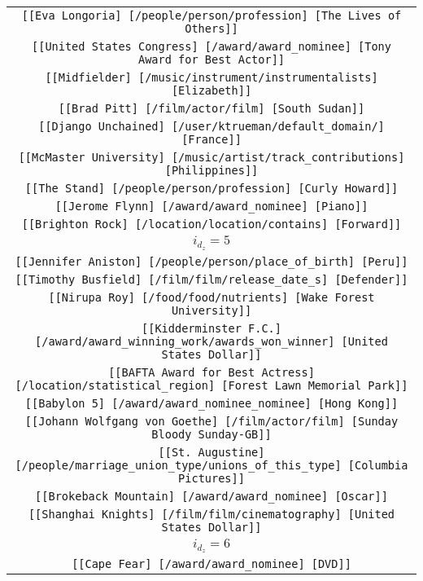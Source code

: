 \begin{longtable}{|c|}
    \texttt{[[Eva Longoria] [/people/person/profession] [The Lives of Others]]}\\
    \texttt{[[United States Congress] [/award/award\_nominee] [Tony Award for Best Actor]]}\\
    \texttt{[[Midfielder] [/music/instrument/instrumentalists] [Elizabeth]]}\\
    \texttt{[[Brad Pitt] [/film/actor/film] [South Sudan]]}\\
    \texttt{[[Django Unchained] [/user/ktrueman/default\_domain/] [France]]}\\
    \texttt{[[McMaster University] [/music/artist/track\_contributions] [Philippines]]}\\
    \texttt{[[The Stand] [/people/person/profession] [Curly Howard]]}\\
    \texttt{[[Jerome Flynn] [/award/award\_nominee] [Piano]]}\\
    \texttt{[[Brighton Rock] [/location/location/contains] [Forward]]}\\
    \hline
    \rowcolor[HTML]{EFEFEF} 
    \textsc{$i_{d_z}=5$}\\ \hline
    \texttt{[[Jennifer Aniston] [/people/person/place\_of\_birth] [Peru]]}\\
    \texttt{[[Timothy Busfield] [/film/film/release\_date\_s] [Defender]]}\\
    \texttt{[[Nirupa Roy] [/food/food/nutrients] [Wake Forest University]]}\\
    \texttt{[[Kidderminster F.C.] [/award/award\_winning\_work/awards\_won\_winner] [United States Dollar]]}\\
    \texttt{[[BAFTA Award for Best Actress] [/location/statistical\_region] [Forest Lawn Memorial Park]]}\\
    \texttt{[[Babylon 5] [/award/award\_nominee\_nominee] [Hong Kong]]}\\
    \texttt{[[Johann Wolfgang von Goethe] [/film/actor/film] [Sunday Bloody Sunday-GB]]}\\
    \texttt{[[St. Augustine] [/people/marriage\_union\_type/unions\_of\_this\_type] [Columbia Pictures]]}\\
    \texttt{[[Brokeback Mountain] [/award/award\_nominee] [Oscar]]}\\
    \texttt{[[Shanghai Knights] [/film/film/cinematography] [United States Dollar]]}\\
    \hline
    \rowcolor[HTML]{EFEFEF} 
    \textsc{$i_{d_z}=6$}\\ \hline
    \texttt{[[Cape Fear] [/award/award\_nominee] [DVD]]}\\

\end{longtable}
